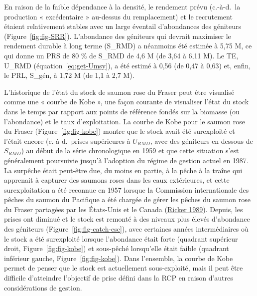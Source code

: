 \documentclass[french,11pt]{book}
\begin{document}
En raison de la faible dépendance à la densité, le rendement prévu (c.-à-d.~la production « excédentaire » au-dessus du remplacement) et le recrutement étaient relativement stables avec un large éventail d'abondances des géniteurs (Figure~\ref{fig:fig-SRR}). L'abondance des géniteurs qui devrait maximiser le rendement durable à long terme (S\_RMD) a néanmoins été estimée à 5,75 M, ce qui donne un PRS de 80 \% de S\_RMD de 4,6 M (de 3,64 à 6,11 M). Le TE, U\_RMD (équation~\ref{eq:get-Umsy}), a été estimé à 0,56 (de 0,47 à 0,63) et, enfin, le PRL, S\_gén, à 1,72 M (de 1,1 à 2,7 M).

L'historique de l'état du stock de saumon rose du Fraser peut être visualisé comme une « courbe de Kobe », une façon courante de visualiser l'état du stock dans le temps par rapport aux points de référence fondés sur la biomasse (ou l'abondance) et le taux d'exploitation. La courbe de Kobe pour le saumon rose du Fraser (Figure~\ref{fig:fig-kobe}) montre que le stock avait été surexploité et l'était encore (c.-à-d.~prises supérieures à \(U_{RMD}\), avec des géniteurs en dessous de \(S_{RMD}\)) au début de la série chronologique en 1959 et que cette situation s'est généralement poursuivie jusqu'à l'adoption du régime de gestion actuel en 1987. La surpêche était peut-être due, du moins en partie, à la pêche à la traîne qui apprenait à capturer des saumons roses dans les eaux extérieures, et cette surexploitation a été reconnue en 1957 lorsque la Commission internationale des pêches du saumon du Pacifique a été chargée de gérer les pêches du saumon rose du Fraser partagées par les États-Unis et le Canada (\protect\hyperlink{ref-rickerHistoryPresentState1989}{Ricker 1989}). Depuis, les prises ont diminué et le stock est remonté à des niveaux plus élevés d'abondance des géniteurs (Figure~\ref{fig:fig-catch-esc}), avec certaines années intermédiaires où le stock a été surexploité lorsque l'abondance était forte (quadrant supérieur droit, Figure~\ref{fig:fig-kobe}) et sous-pêché lorsqu'elle était faible (quadrant inférieur gauche, Figure~\ref{fig:fig-kobe}). Dans l'ensemble, la courbe de Kobe permet de penser que le stock est actuellement sous-exploité, mais il peut être difficile d'atteindre l'objectif de prise défini dans la RCP en raison d'autres considérations de gestion.
\end{document}
